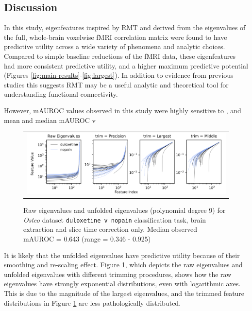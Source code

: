 \documentclass[12pt]{spieman}  %
\begin{document}
\begin{spacing}{2}
\section{Discussion}

In this study, eigenfeatures inspired by RMT and derived from the eigenvalues
of the full, whole-brain voxelwise fMRI correlation matrix were found to have
predictive utility across a wide variety of phenomena and analytic choices.
Compared to simple baseline reductions of the fMRI data, these eigenfeatures
had more consistent predictive utility, and a higher maximum predictive
potential (Figures \ref{fig:main-results}-\ref{fig:largest}). In addition to
evidence from previous studies
\cite{sebaRandomMatrixAnalysis2003,wangRandomMatrixTheory2016,matharooSpontaneousBackpainAlters2020}
this suggests RMT may be a useful analytic and theoretical tool for
understanding functional connectivity.

However, mAUROC values observed in this study were highly sensitive to , and mean and
median mAUROC v

\begin{figure}
\begin{center}
\begin{tabular}{c}
\includegraphics[width=6.5in]{unfolded_osteo_duloxetine_v_nopain.png}
\end{tabular}
\end{center}
\caption
{ \label{fig:unfolded} Raw eigenvalues and unfolded eigenvalues (polynomial
degree 9) for \textit{Osteo} dataset \footnotesize\texttt{duloxetine v nopain}
classification task, brain extraction and slice time correction only. Median
observed mAUROC = 0.643 (range = 0.346 - 0.925)}
\end{figure}

It is likely that the unfolded eigenvalues have predictive utility because of
their smoothing and re-scaling effect. Figure \ref{fig:unfolded}, which depicts
the raw eigenvalues and unfolded eigenvalues with different trimming
procedures, shows how the raw eigenvalues have strongly exponential
distributions, even with logarithmic axes. This is due to the
magnitude of the largest eigenvalues, and the trimmed feature distributions in
Figure \ref{fig:unfolded} are less pathologically distributed.


\end{spacing}
\end{document}
